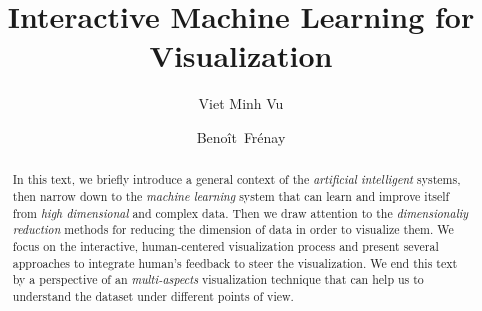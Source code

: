 \documentclass[sigconf,natbib=false]{acmart}
\begin{document}
\title{Interactive Machine Learning for Visualization}

\author{Viet Minh Vu}

\author{Beno\^it~Fr\'enay}

\renewcommand{\shortauthors}{V. M. Vu}

\begin{abstract}
In this text, we briefly introduce a general context of the \emph{artificial intelligent} systems, then narrow down to the \emph{machine learning} system that can learn and improve itself from \emph{high dimensional} and complex data. Then we draw attention to the \emph{dimensionaliy reduction} methods for reducing the dimension of data in order to visualize them. We focus on the interactive, human-centered visualization process and present several approaches to integrate human's feedback to steer the visualization. We end this text by a perspective of an \emph{multi-aspects} visualization technique that can help us to understand the dataset under different points of view.

\end{abstract}


\maketitle



\printbibliography
\end{document}
